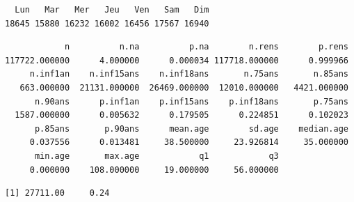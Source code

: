 \documentclass[]{article}
\newenvironment{Shaded}{\begin{snugshade}}{\end{snugshade}}
\newcommand{\KeywordTok}[1]{\textcolor[rgb]{0.13,0.29,0.53}{\textbf{{#1}}}}
\newcommand{\StringTok}[1]{\textcolor[rgb]{0.31,0.60,0.02}{{#1}}}
\newcommand{\CommentTok}[1]{\textcolor[rgb]{0.56,0.35,0.01}{\textit{{#1}}}}
\newcommand{\NormalTok}[1]{{#1}}
\begin{document}
\begin{Shaded}
\end{Shaded}

\begin{verbatim}
  Lun   Mar   Mer   Jeu   Ven   Sam   Dim 
18645 15880 16232 16002 16456 17567 16940 
\end{verbatim}

\begin{Shaded}
\end{Shaded}

\begin{verbatim}
            n          n.na          p.na        n.rens        p.rens 
117722.000000      4.000000      0.000034 117718.000000      0.999966 
     n.inf1an    n.inf15ans    n.inf18ans       n.75ans       n.85ans 
   663.000000  21131.000000  26469.000000  12010.000000   4421.000000 
      n.90ans      p.inf1an    p.inf15ans    p.inf18ans       p.75ans 
  1587.000000      0.005632      0.179505      0.224851      0.102023 
      p.85ans       p.90ans      mean.age        sd.age    median.age 
     0.037556      0.013481     38.500000     23.926814     35.000000 
      min.age       max.age            q1            q3 
     0.000000    108.000000     19.000000     56.000000 
\end{verbatim}

\begin{Shaded}
\end{Shaded}

\begin{verbatim}
[1] 27711.00     0.24
\end{verbatim}

\begin{Shaded}
\end{Shaded}
\end{document}
